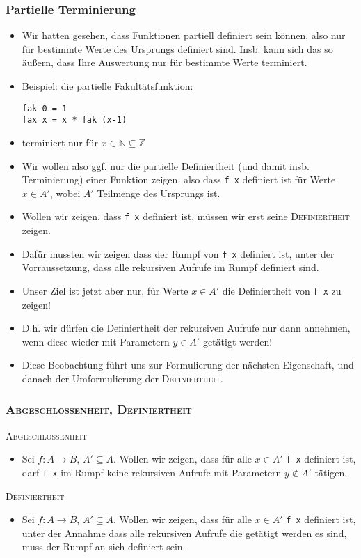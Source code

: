 \documentclass{beamer}
\begin{document}
\begin{frame}[fragile]
  \frametitle{Partielle Terminierung}
  \begin{itemize}
  \item Wir hatten gesehen, dass Funktionen partiell definiert sein können, also nur für bestimmte Werte des Ursprungs definiert sind. Insb. kann sich das so äußern, dass Ihre Auswertung nur für bestimmte Werte terminiert.
  \item Beispiel: die partielle Fakultätsfunktion:
\begin{Verbatim}
fak 0 = 1
fax x = x * fak (x-1)
\end{Verbatim}
  \item terminiert nur für \(x\in \mathbb{N}\subseteq \mathbb{Z}\)
  \item Wir wollen also ggf. nur die partielle Definiertheit (und damit insb. Terminierung) einer Funktion zeigen, also dass \texttt{f x} definiert ist für Werte \(x\in A'\), wobei \(A'\) Teilmenge des Ursprungs ist.
  \end{itemize}
\end{frame}
\begin{frame}
  \begin{itemize}
  \item Wollen wir zeigen, dass \texttt{f x} definiert ist, müssen wir erst seine \textsc{Definiertheit} zeigen.
  \item Dafür mussten wir zeigen dass der Rumpf von \texttt{f x} definiert ist, unter der Vorraussetzung, dass alle rekursiven Aufrufe im Rumpf definiert sind.
  \item Unser Ziel ist jetzt aber nur, für Werte  \(x\in A'\) die Definiertheit von \texttt{f x} zu zeigen!
\item D.h. wir dürfen die Definiertheit der rekursiven Aufrufe nur dann annehmen, wenn diese wieder mit Parametern \(y\in A'\) getätigt werden!
\item Diese Beobachtung führt uns zur Formulierung der nächsten Eigenschaft, und danach der Umformulierung der \textsc{Definiertheit}.
  \end{itemize}
\end{frame}
\begin{frame}
  \frametitle{\textsc{Abgeschlossenheit, Definiertheit}}
  \textsc{Abgeschlossenheit}
  \begin{itemize}
  \item Sei \(f:A\to B\), \(A'\subseteq A\). Wollen wir zeigen, dass für alle \(x\in A'\) \texttt{f x} definiert ist, darf \texttt{f x} im Rumpf keine rekursiven Aufrufe mit Parametern \(y\notin A'\) tätigen.
  \end{itemize}
  \textsc{Definiertheit}
  \begin{itemize}
  \item Sei \(f:A\to B\), \(A'\subseteq A\). Wollen wir zeigen, dass für alle \(x\in A'\) \texttt{f x} definiert ist, unter der Annahme dass alle rekursiven Aufrufe die getätigt werden es sind, muss der Rumpf an sich definiert sein.
  \end{itemize}
\end{frame}
\end{document}
